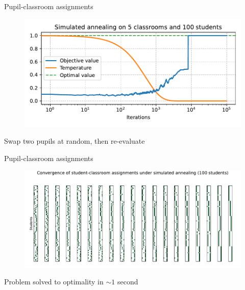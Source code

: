 \documentclass[12pt, aspectratio=149]{beamer}
\theoremstyle{plain}
\begin{document}
\begin{frame}[fragile]{Pupil-classroom assignments}
\vspace*{-1.5em}
\begin{center}
 \begin{figure}
    	\centering
    	\includegraphics[width=0.99\linewidth]{figures/classroom_sim_annealing.pdf}
 \end{figure}
 \end{center}
\vspace*{-2em}
\begin{center}
Swap two pupils at random, then re-evaluate
\end{center}
\end{frame}

\begin{frame}[fragile]{Pupil-classroom assignments}
\vspace*{-1.5em}
\begin{center}
 \begin{figure}
    	\centering
    	\includegraphics[width=0.99\linewidth]{figures/classroom_convergence.pdf}
 \end{figure}
 \end{center}
\vspace*{-2em}
\begin{center}
Problem solved to optimality in $\sim 1$ second
\end{center}
\end{frame}
\end{document}
